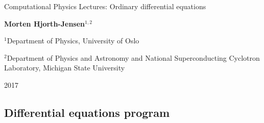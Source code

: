 \documentclass[%
oneside,                 %
final,                   %
10pt]{article}
\begin{document}

\newcommand{\exercisesection}[1]{\subsection*{#1}}






\thispagestyle{empty}

\begin{center}
{\LARGE\bf
\begin{spacing}{1.25}
Computational Physics  Lectures: Ordinary differential equations
\end{spacing}
}
\end{center}


\begin{center}
{\bf Morten Hjorth-Jensen${}^{1, 2}$} \\ [0mm]
\end{center}

\begin{center}
\centerline{{\small ${}^1$Department of Physics, University of Oslo}}
\centerline{{\small ${}^2$Department of Physics and Astronomy and National Superconducting Cyclotron Laboratory, Michigan State University}}
\end{center}
    

\begin{center}
2017
\end{center}

\vspace{1cm}


\subsection*{Differential equations program}

\end{document}
